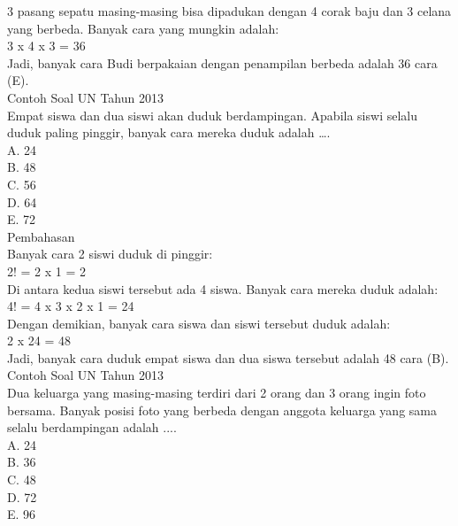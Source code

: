 \documentclass[11pt,fleqn]{book} %
\begin{document}
3 pasang sepatu masing-masing bisa dipadukan dengan 4 corak baju dan 3 celana yang berbeda. Banyak cara yang mungkin adalah:\\

3 x 4 x 3 = 36\\

Jadi, banyak cara Budi berpakaian dengan penampilan berbeda adalah 36 cara (E).\\

Contoh Soal UN Tahun 2013\\
Empat siswa dan dua siswi akan duduk berdampingan. Apabila siswi selalu duduk paling pinggir, banyak cara mereka duduk adalah ….\\

A.   24\\
B.   48\\
C.   56\\
D.   64\\
E.   72\\

Pembahasan\\
Banyak cara 2 siswi duduk di pinggir:\\

2! = 2 x 1 = 2\\

Di antara kedua siswi tersebut ada 4 siswa. Banyak cara mereka duduk adalah:\\

4! = 4 x 3 x 2 x 1 = 24\\

Dengan demikian, banyak cara siswa dan siswi tersebut duduk adalah:\\

2 x 24 = 48\\

Jadi, banyak cara duduk empat siswa dan dua siswa tersebut adalah 48 cara (B).\\

Contoh Soal UN Tahun 2013\\
Dua keluarga yang masing-masing terdiri dari 2 orang dan 3 orang ingin foto bersama. Banyak posisi foto yang berbeda dengan anggota keluarga yang sama selalu berdampingan adalah ....\\

A.   24\\
B.   36\\
C.   48\\
D.   72\\
E.   96\\
\end{document}
